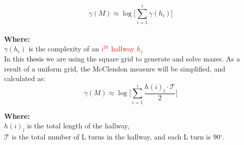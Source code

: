 \begin{equation}
\gamma(M) \approx \log \bigl[\sum_{i =1}^{i}\gamma(h_i)\bigr]
\end{equation}
\\
\textbf{Where:}\\
$\gamma(h_i)$ is the complexity of an \textcolor{red}{$i^{th}$ hallway $h_i$}\\
 \newline
In this \textcolor{black}{thesis} we are using the square grid to generate and solve mazes. As a result of \textcolor{black}{a} uniform grid, the McClendon measure will be simplified, and calculated as:
\begin{equation} 
\gamma(M) \approx \log \bigl[\sum_{i =1}^{i}\frac{h(i)_l\cdot \mathcal{T}}{2}\bigr]
\end{equation}

\textbf{Where:}\\
$h(i)_l$ is the total length of the hallway,\\
$\mathcal{T}$ is the total number of L turns in the hallway, and each L turn is 90$^\circ$.%
